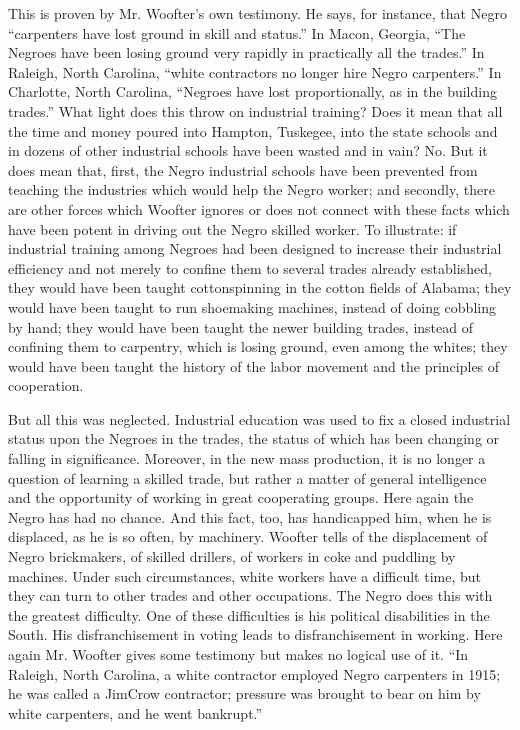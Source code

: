 \documentclass[letterpaper,10pt,english]{jupyterBook}
\begin{document}
\sphinxAtStartPar
This is proven by Mr. Woofter’s own testimony. He says, for instance, that Negro “carpenters have lost ground in skill and status.” In Macon, Georgia, “The Negroes have been losing ground very rapidly in practically all the trades.” In Raleigh, North Carolina, “white contractors no longer hire Negro carpenters.” In Charlotte, North Carolina, “Negroes have
lost proportionally, as in the building trades.” What light does this throw on industrial training? Does it mean that all the time and money poured into Hampton, Tuskegee, into the state schools and in dozens of other industrial schools have been wasted and in vain? No. But it does mean that, first, the Negro industrial schools have been prevented from teaching the industries which would help the Negro worker; and secondly, there are other forces which Woofter ignores or does not connect with these facts which have been potent in driving out the Negro skilled worker. To illustrate: if industrial training among Negroes had been designed to increase their industrial efficiency and not merely to confine them to several trades already established, they would have been taught cotton\sphinxhyphen{}spinning in the cotton fields of Alabama; they would have been taught to run shoe\sphinxhyphen{}making machines, instead of doing cobbling by hand; they would have been taught the newer building trades, instead of confining them to carpentry, which is losing ground, even among the whites; they would have been taught the history of the labor movement and the principles of co\sphinxhyphen{}operation.

\sphinxAtStartPar
But all this was neglected. Industrial education was used to fix a closed industrial status upon the Negroes in the trades, the status of which has been changing or falling in significance. Moreover, in the new mass production, it is no longer a question of learning a skilled trade, but rather a matter of general intelligence and the opportunity of working in great co\sphinxhyphen{}operating groups. Here again the Negro has had no chance. And this fact, too, has handicapped him, when he is displaced, as he is so often, by machinery. Woofter tells of the displacement of Negro brickmakers, of skilled drillers, of workers in coke and puddling by machines. Under such circumstances, white workers have a difficult time, but they can turn to other trades and other occupations. The Negro does this with the greatest difficulty. One of these difficulties is his political disabilities in the South. His disfranchisement in voting leads to disfranchisement in working. Here again Mr. Woofter gives some testimony but makes no logical use of it. “In Raleigh, North Carolina, a white contractor employed Negro carpenters in 1915; he was called a Jim\sphinxhyphen{}Crow contractor; pressure was brought to bear on him by white carpenters, and he went bankrupt.”
\end{document}
